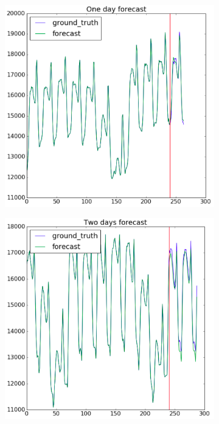 \documentclass[12pt,fleqn,unicode]{article}
\begin{document}
\begin{figure}[H]
    \centering
    \begin{subfigure}[b]{0.3\textwidth}
        \includegraphics[width=\textwidth]{oneday.png}
    \end{subfigure}
    \begin{subfigure}[b]{0.3\textwidth}
        \includegraphics[width=\textwidth]{twodays.png}

\end{subfigure}
\end{figure}
\end{document}
